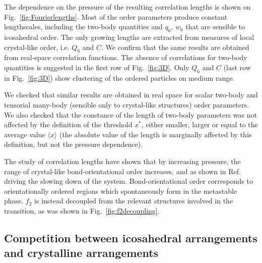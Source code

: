 \documentclass[twocolumn,superscriptaddress]{revtex4-1}
\begin{document}
The dependence on the pressure of the resulting correlation lengths is shown on Fig.~\ref{fig:Fourierlengths}. Most of the order parameters produce constant lengthscales, including the two-body quantities and $q_6$, $w_6$ that are sensible to icosahedral order. The only growing lengths are extracted from measures of local crystal-like order, i.e. $Q_6$ and $C$. We confirm that the same results are obtained from real-space correlation functions. The absence of correlations for two-body quantities is suggested in the first row of Fig.~\ref{fig:3D}. Only $Q_6$ and $C$ (last row in Fig.~\ref{fig:3D}) show clustering of the ordered particles on medium range.

We checked that similar results are obtained in real space for scalar two-body and tensorial many-body (sensible only to crystal-like structures) order parameters. We also checked that the constance of the length of two-body parameters was not affected by the definition of the threshold $x^*$, either smaller, larger or equal to the average value $\langle x\rangle$ (the absolute value of the length is marginally affected by this definition, but not the pressure dependence).

The study of correlation lengths have shown that by increasing pressure, the range of
crystal-like bond-orientational order increases, and as shown in Ref.~\cite{tanaka,mathieu_icosahedra}
driving the slowing down of the system. Bond-orientational order corresponds to
orientationally ordered regions which spontaneously form in the metastable phase.
$f_2$ is instead decoupled from the relevant structures involved in the transition, as
was shown in Fig.~\ref{fig:f2decoupling}.


\subsection{Competition between icosahedral arrangements and crystalline arrangements}\label{sec:icosahedra}
\end{document}
